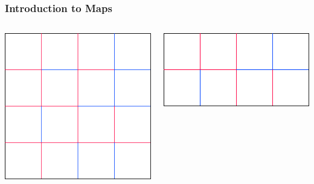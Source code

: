 \documentclass{beamer}
\begin{document}
\begin{frame}
\frametitle{Introduction to Maps}

\begin{columns}[c]
\includegraphics[width=\textwidth]{sam_images/yes-map-1.pdf}

\bigskip
\bigskip

\includegraphics[width=\textwidth]{sam_images/yes-map-2.pdf}

\pause


\end{columns}
\end{frame}
\end{document}
